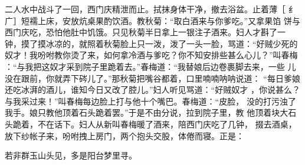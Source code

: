 二人水中战斗了一回，西门庆精泄而止。拭抹身体干净，撤去浴盆。止着薄［
纟广］短襦上床，安放炕桌果酌饮酒。教秋菊：“取白酒来与你爹吃。”又拿果馅
饼与西门庆吃，恐怕他肚中饥饿。只见秋菊半日拿上一银注子酒来。妇人才斟了一
钟，摸了摸冰凉的，就照着秋菊脸上只一泼，泼了一头一脸，骂道：“好贼少死的
奴才！我吩咐教你烫了来，如何拿冷酒与爹吃？你不知安排些甚么心儿？”叫春梅
：“与我把这奴才采到院子里跪着去。”春梅道：“我替娘后边卷裹脚去来，一些
儿没在跟前，你就弄下硶儿了。”那秋菊把嘴谷都着，口里喃喃呐呐说道：
“每日爹娘还吃冰湃的酒儿，谁知今日又改了腔儿。”妇人听见骂道：“好贼奴才
，你说甚么？与我采过来！”叫春梅每边脸上打与他十个嘴巴。春梅道：“皮脸，
没的打污浊了我手。娘只教他顶着石头跪着罢。”于是不由分说，拉到院子里，教
他顶着块大石头跪着，不在话下。妇人从新叫春梅暖了酒来，陪西门庆吃了几钟，
掇去酒桌，放下纱帐子来，吩咐拽上房门，两个抱头交股，体倦而寝。正是：

若非群玉山头见，多是阳台梦里寻。